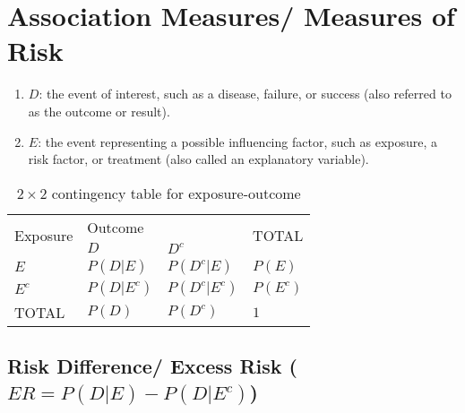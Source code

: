 \section{Association Measures/ Measures of Risk}

\begin{enumerate}
    \item $D$: the event of interest, such as a disease, failure, or success (also referred to as the outcome or result).
    \hfill \cite{statistics/book/Statistics-for-Data-Scientists/Maurits-Kaptein, common/online/chatgpt}

    \item $E$: the event representing a possible influencing factor, such as exposure, a risk factor, or treatment (also called an explanatory variable).
    \hfill \cite{statistics/book/Statistics-for-Data-Scientists/Maurits-Kaptein, common/online/chatgpt}
\end{enumerate}

\begin{customArrayStretch}{1.2}
\begin{table}[H]
    \centering
    \begin{tabular}{|l|l|l|l|}
        \hline

        \multirow{2}{*}{Exposure} &  \multicolumn{2}{|l|}{Outcome} & \multirow{2}{*}{TOTAL} \\
        \cline{2-3}
        & $D$ & $D^c$ & \\
        \hline

        $E$ & $P(D|E)$ & $P(D^c|E)$ & $P(E)$ \\ \hline

        $E^c$ & $P(D|E^c)$ & $P(D^c|E^c)$ & $P(E^c)$ \\ \hline

        TOTAL & $P(D)$ & $P(D^c)$ & $1$ \\ \hline

    \end{tabular}
    \caption{$2 \times 2$ contingency table for exposure-outcome}
    \label{statistics/probability-theory/Conditional Probability/contingency-table-exposure-outcome}
\end{table}
\end{customArrayStretch}

\subsection{Risk Difference/ Excess Risk ($ER = P(D|E) - P(D|E^c)$)}

